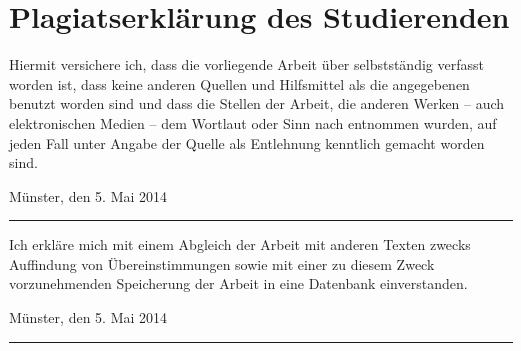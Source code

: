 \section*{Plagiatserklärung des Studierenden}
Hiermit versichere ich, dass die vorliegende Arbeit über \emph{\MyTitle} selbstständig verfasst worden ist, dass keine anderen Quellen und Hilfsmittel als die angegebenen benutzt worden sind und dass die Stellen der Arbeit, die anderen Werken – auch elektronischen Medien – dem Wortlaut oder Sinn nach entnommen wurden, auf jeden Fall unter Angabe der Quelle als Entlehnung kenntlich gemacht worden sind.

\vspace{.5cm}\hfill Münster, den 5. Mai 2014\hspace{.6cm}\rule{6cm}{.5pt}
\vspace{1cm}

\makeatletter\@title\makeatother
Ich erkläre mich mit einem Abgleich der Arbeit mit anderen Texten zwecks Auffindung von Übereinstimmungen sowie mit einer zu diesem Zweck vorzunehmenden Speicherung der Arbeit in eine Datenbank einverstanden.

\vspace{.5cm}\hfill Münster, den 5. Mai 2014\hspace{.6cm}\rule{6cm}{.5pt}
